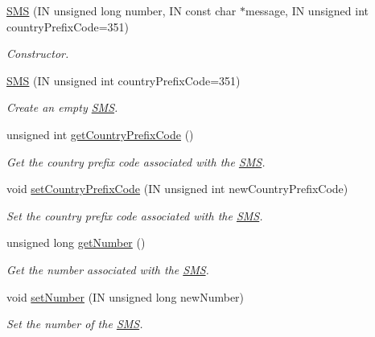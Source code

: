 \begin{DoxyCompactItemize}
\item 
\hyperlink{class_easyuino_1_1_s_m_s_a5c56de204df53688169644314e8f0efe}{S\+MS} (IN unsigned long number, IN const char $\ast$message, IN unsigned int country\+Prefix\+Code=351)
\begin{DoxyCompactList}\small\item\em Constructor. \end{DoxyCompactList}\item 
\hyperlink{class_easyuino_1_1_s_m_s_a9088a459857f18c463d3ad198bbe0abd}{S\+MS} (IN unsigned int country\+Prefix\+Code=351)
\begin{DoxyCompactList}\small\item\em Create an empty \hyperlink{class_easyuino_1_1_s_m_s}{S\+MS}. \end{DoxyCompactList}\item 
unsigned int \hyperlink{class_easyuino_1_1_s_m_s_aef79317e0ee7511d85814a10aaa15e14}{get\+Country\+Prefix\+Code} ()
\begin{DoxyCompactList}\small\item\em Get the country prefix code associated with the \hyperlink{class_easyuino_1_1_s_m_s}{S\+MS}. \end{DoxyCompactList}\item 
void \hyperlink{class_easyuino_1_1_s_m_s_a05650de23138fee2dfc1ce9a8e2b0429}{set\+Country\+Prefix\+Code} (IN unsigned int new\+Country\+Prefix\+Code)
\begin{DoxyCompactList}\small\item\em Set the country prefix code associated with the \hyperlink{class_easyuino_1_1_s_m_s}{S\+MS}. \end{DoxyCompactList}\item 
unsigned long \hyperlink{class_easyuino_1_1_s_m_s_ab46be8f783d59208245e9d14d3a046d5}{get\+Number} ()
\begin{DoxyCompactList}\small\item\em Get the number associated with the \hyperlink{class_easyuino_1_1_s_m_s}{S\+MS}. \end{DoxyCompactList}\item 
void \hyperlink{class_easyuino_1_1_s_m_s_a6d9b21c6480b7e859dfb16688090ed1c}{set\+Number} (IN unsigned long new\+Number)
\begin{DoxyCompactList}\small\item\em Set the number of the \hyperlink{class_easyuino_1_1_s_m_s}{S\+MS}. \end{DoxyCompactList}\item 

\end{DoxyCompactItemize}
